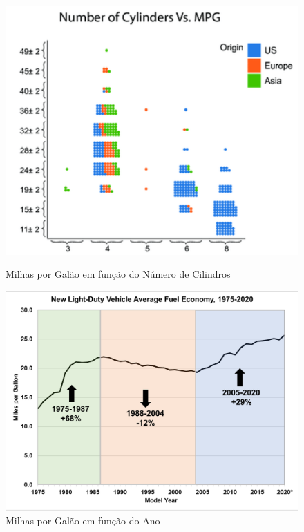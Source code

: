 \documentclass{report}
\begin{document}
\begin{figure}[h!]
    \centering
    \begin{minipage}[b]{0.45\textwidth}
        \centering
        \includegraphics[width=\linewidth]{images/plots/independent/MPGbyCylinders.png} 
        \caption{\centering Milhas por Galão em função do Número de Cilindros}
        \label{fig: MPGpCylinder}
    \end{minipage} \hfill
    \begin{minipage}[b]{0.45\textwidth}
        \centering
        \includegraphics[width=\linewidth]{images/plots/independent/MPGbyYear.png}
        \caption{\centering Milhas por Galão em função do Ano}
        \label{fig: MPGbyYear}
    \end{minipage}
\end{figure}
\end{document}
